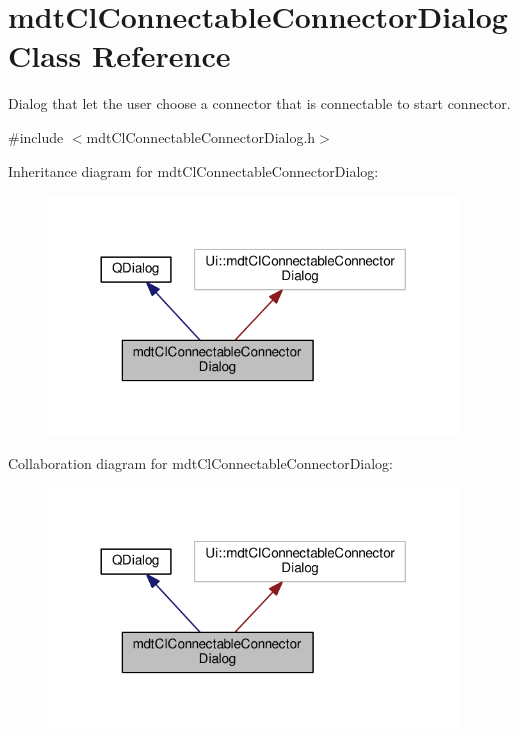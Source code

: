 \hypertarget{classmdt_cl_connectable_connector_dialog}{\section{mdt\-Cl\-Connectable\-Connector\-Dialog Class Reference}
\label{classmdt_cl_connectable_connector_dialog}
}


Dialog that let the user choose a connector that is connectable to start connector.  




{\ttfamily \#include $<$mdt\-Cl\-Connectable\-Connector\-Dialog.\-h$>$}



Inheritance diagram for mdt\-Cl\-Connectable\-Connector\-Dialog\-:
\nopagebreak
\begin{figure}[H]
\begin{center}
\leavevmode
\includegraphics[width=308pt]{classmdt_cl_connectable_connector_dialog__inherit__graph}
\end{center}
\end{figure}


Collaboration diagram for mdt\-Cl\-Connectable\-Connector\-Dialog\-:
\nopagebreak
\begin{figure}[H]
\begin{center}
\leavevmode
\includegraphics[width=308pt]{classmdt_cl_connectable_connector_dialog__coll__graph}
\end{center}
\end{figure}
